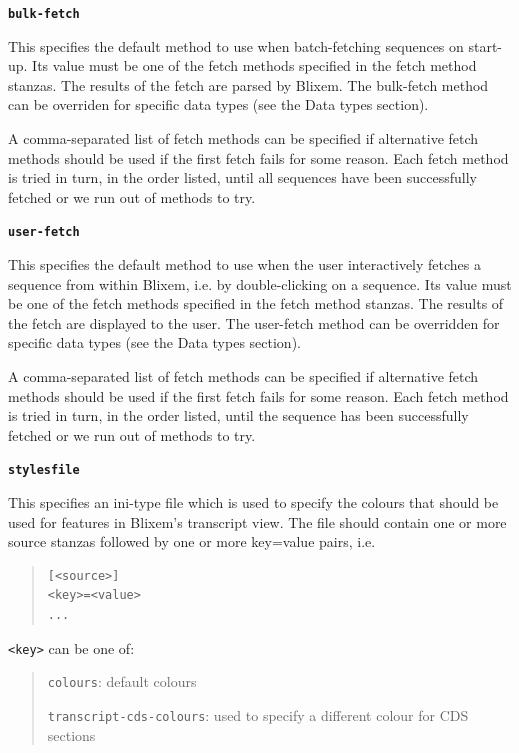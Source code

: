 \documentclass[letterpaper]{article}
\newcommand\textstyleSourceText[1]{\texttt{#1}}
\begin{document}
\bigskip

{\textstyleSourceText{\textrm{\textbf{bulk-fetch}}}\textbf{ }}

{This specifies the default method to use when batch-fetching sequences
on start-up. Its value must be one of the fetch methods specified in
the fetch method stanzas. The results of the fetch are parsed by
Blixem. The bulk-fetch method can be overriden for specific data types
(see the Data types section). }

\bigskip

{A comma-separated list of fetch methods can be specified if alternative
fetch methods should be used if the first fetch fails for some reason.
Each fetch method is tried in turn, in the order listed, until all
sequences have been successfully fetched or we run out of methods to
try.}

\bigskip

{\textstyleSourceText{\textrm{\textbf{user-fetch}}}\textbf{ }}

{This specifies the default method to use when the user interactively
fetches a sequence from within Blixem, i.e. by double-clicking on a
sequence. Its value must be one of the fetch methods specified in the
fetch method stanzas. The results of the fetch are displayed to the
user. The user-fetch method can be overridden for specific data types
(see the Data types section). }

\bigskip

{A comma-separated list of fetch methods can be specified if alternative
fetch methods should be used if the first fetch fails for some reason.
Each fetch method is tried in turn, in the order listed, until the
sequence has been successfully fetched or we run out of methods to try.}

\bigskip

{\textstyleSourceText{\textrm{\textbf{stylesfile}}}\textbf{ }}

This specifies an ini-type file which is used to specify the colours that should be used for features in Blixem's transcript view. The file should contain one or more source stanzas followed by one or more key=value pairs, i.e.

\begin{quote}
\begin{verbatim}
[<source>]
<key>=<value>
...
\end{verbatim}
\end{quote}

\texttt{{\textless}key{\textgreater}} can be one of:
\begin{quote}
\texttt{colours}: default colours

\texttt{transcript-cds-colours}: used to specify a different colour for CDS sections
\end{quote}
\end{document}
